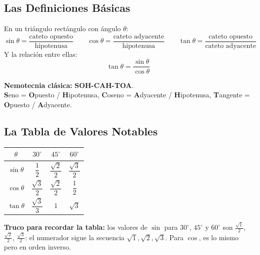 \documentclass[12pt, letterpaper]{article}
\begin{document}
\subsection{Las Definiciones Básicas}

\begin{cuadroteoria}
  En un triángulo rectángulo con ángulo $\theta$:
  \[
    \sin\theta = \frac{\text{cateto opuesto}}{\text{hipotenusa}} \qquad
    \cos\theta = \frac{\text{cateto adyacente}}{\text{hipotenusa}} \qquad
    \tan\theta = \frac{\text{cateto opuesto}}{\text{cateto adyacente}}
  \]
  Y la relación entre ellas:
  \[
    \tan\theta = \frac{\sin\theta}{\cos\theta}
  \]
\end{cuadroteoria}

\begin{cuadroextra}
  \textbf{Nemotecnia clásica:} \textbf{SOH-CAH-TOA}.\\
  \textbf{S}eno = \textbf{O}puesto / \textbf{H}ipotenusa,
  \textbf{C}oseno = \textbf{A}dyacente / \textbf{H}ipotenusa,
  \textbf{T}angente = \textbf{O}puesto / \textbf{A}dyacente.
\end{cuadroextra}

\subsection{La Tabla de Valores Notables}

\begin{cuadroteoria}
  \centering
  \begin{tabular}{c|ccc}
    \toprule
    $\theta$ & $30^\circ$ & $45^\circ$ & $60^\circ$ \\
    \midrule
    $\sin\theta$ & $\dfrac{1}{2}$ & $\dfrac{\sqrt{2}}{2}$ & $\dfrac{\sqrt{3}}{2}$ \\[10pt]
    $\cos\theta$ & $\dfrac{\sqrt{3}}{2}$ & $\dfrac{\sqrt{2}}{2}$ & $\dfrac{1}{2}$ \\[10pt]
    $\tan\theta$ & $\dfrac{\sqrt{3}}{3}$ & $1$ & $\sqrt{3}$ \\
    \bottomrule
  \end{tabular}
\end{cuadroteoria}

\begin{cuadropasos}
  \textbf{Truco para recordar la tabla:} los valores de $\sin$ para $30^\circ$, $45^\circ$ y $60^\circ$ son $\frac{\sqrt{1}}{2}$, $\frac{\sqrt{2}}{2}$, $\frac{\sqrt{3}}{2}$: el numerador sigue la secuencia $\sqrt{1}, \sqrt{2}, \sqrt{3}$. Para $\cos$, es lo mismo pero en orden inverso.
\end{cuadropasos}
\end{document}
